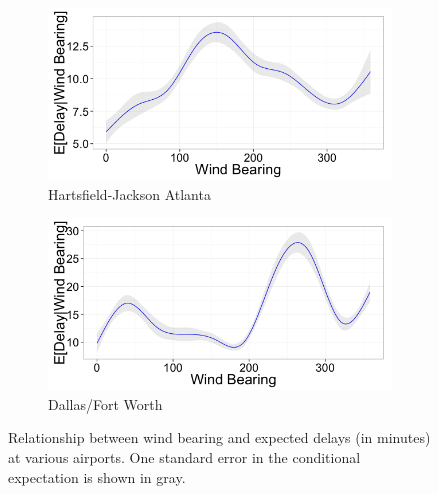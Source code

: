 \documentclass[twocolumn]{article}
\begin{document}
\begin{figure}
\centering
\begin{subfigure}{0.45\textwidth}
    \centering
    \includegraphics[width=\linewidth]{figures/windBearing-ATL.png}
    \caption{Hartsfield-Jackson Atlanta}
\end{subfigure}
\begin{subfigure}{0.45\textwidth}
    \centering
    \includegraphics[width=\linewidth]{figures/windBearing-DFW.png}
    \caption{Dallas/Fort Worth}
\end{subfigure}
\caption{Relationship between wind bearing and expected delays (in minutes) at various airports. One standard error in the conditional expectation is shown in gray.} 
\label{fig:wind-bearing-feature}
\end{figure}
\end{document}
